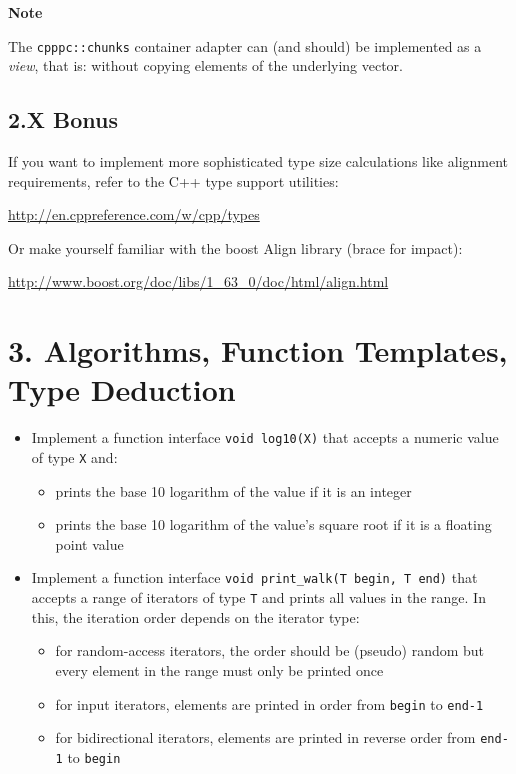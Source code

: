 \documentclass[]{article}
\providecommand{\tightlist}{%
  \setlength{\itemsep}{0pt}\setlength{\parskip}{0pt}}
\begin{document}
\textbf{Note}

The \texttt{cpppc::chunks} container adapter can (and should) be
implemented as a \emph{view}, that is: without copying elements of the
underlying vector.

\subsection{2.X Bonus}\label{x-bonus}

If you want to implement more sophisticated type size calculations like
alignment requirements, refer to the C++ type support utilities:

\url{http://en.cppreference.com/w/cpp/types}

Or make yourself familiar with the boost Align library (brace for
impact):

\url{http://www.boost.org/doc/libs/1_63_0/doc/html/align.html}

\section{3. Algorithms, Function Templates, Type
Deduction}\label{algorithms-function-templates-type-deduction}

\begin{itemize}
\item
  Implement a function interface \texttt{void\ log10(X)} that accepts a
  numeric value of type \texttt{X} and:

  \begin{itemize}
  \tightlist
  \item
    prints the base 10 logarithm of the value if it is an integer
  \item
    prints the base 10 logarithm of the value's square root if it is a
    floating point value
  \end{itemize}
\item
  Implement a function interface
  \texttt{void\ print\_walk(T\ begin,\ T\ end)} that accepts a range of
  iterators of type \texttt{T} and prints all values in the range. In
  this, the iteration order depends on the iterator type:

  \begin{itemize}
  \tightlist
  \item
    for random-access iterators, the order should be (pseudo) random but
    every element in the range must only be printed once
  \item
    for input iterators, elements are printed in order from
    \texttt{begin} to \texttt{end-1}
  \item
    for bidirectional iterators, elements are printed in reverse order
    from \texttt{end-1} to \texttt{begin}
  \end{itemize}
\end{itemize}
\end{document}
